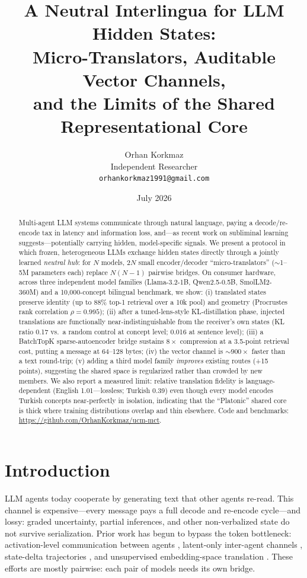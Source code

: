 \documentclass[11pt]{article}
\title{A Neutral Interlingua for LLM Hidden States:\\
Micro-Translators, Auditable Vector Channels,\\
and the Limits of the Shared Representational Core}
\author{Orhan Korkmaz\\
\small Independent Researcher\\
\small \texttt{orhankorkmaz1991@gmail.com}}
\date{July 2026}
\begin{document}
\maketitle

\begin{abstract}
Multi-agent LLM systems communicate through natural language, paying a
decode/re-encode tax in latency and information loss, and---as recent work on
subliminal learning suggests---potentially carrying hidden, model-specific
signals. We present a protocol in which frozen, heterogeneous LLMs exchange
hidden states directly through a jointly learned \emph{neutral hub}: for $N$
models, $2N$ small encoder/decoder ``micro-translators'' ($\sim$1--5M
parameters each) replace $N(N{-}1)$ pairwise bridges. On consumer hardware,
across three independent model families (Llama-3.2-1B, Qwen2.5-0.5B,
SmolLM2-360M) and a 10{,}000-concept bilingual benchmark, we show:
(i) translated states preserve identity (up to 88\% top-1 retrieval over a
10k pool) and geometry (Procrustes rank correlation $\rho=0.995$);
(ii) after a tuned-lens-style KL-distillation phase, injected translations are
functionally near-indistinguishable from the receiver's own states (KL ratio
0.17 vs.\ a random control at concept level; 0.016 at sentence level);
(iii) a BatchTopK sparse-autoencoder bridge sustains $8\times$ compression at
a 3.5-point retrieval cost, putting a message at 64--128 bytes;
(iv) the vector channel is ${\sim}900\times$ faster than a text round-trip;
(v) adding a third model family \emph{improves} existing routes (+15 points),
suggesting the shared space is regularized rather than crowded by new members.
We also report a measured limit: relative translation fidelity is
language-dependent (English 1.01---lossless; Turkish 0.39) even though every
model encodes Turkish concepts near-perfectly in isolation, indicating that
the ``Platonic'' shared core is thick where training distributions overlap
and thin elsewhere. Code and benchmarks:
\url{https://github.com/OrhanKorkmaz/ucm-mct}.
\end{abstract}

\section{Introduction}
LLM agents today cooperate by generating text that other agents re-read.
This channel is expensive---every message pays a full decode and re-encode
cycle---and lossy: graded uncertainty, partial inferences, and other
non-verbalized state do not survive serialization. Prior work has begun to
bypass the token bottleneck: activation-level communication between agents
\cite{ramesh2025activations}, latent-only inter-agent channels
\cite{interlat2026}, state-delta trajectories \cite{sde2025}, and
unsupervised embedding-space translation \cite{jha2025vec2vec}. These efforts
are mostly pairwise: each pair of models needs its own bridge.
\end{document}
